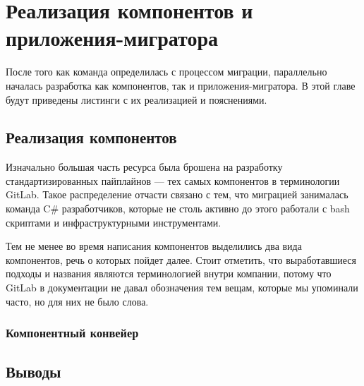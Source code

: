 \chapter{Реализация компонентов и приложения-мигратора} \label{ch:ch3}
После того как команда определилась с процессом миграции, параллельно началась разработка как компонентов, так и приложения-мигратора.
В этой главе будут приведены листинги с их реализацией и пояснениями.

\section{Реализация компонентов} \label{sec:components-impl}
Изначально большая часть ресурса была брошена на разработку стандартизированных пайплайнов — тех самых компонентов в терминологии GitLab.
Такое распределение отчасти связано с тем, что миграцией занималась команда C\# разработчиков, которые не столь активно до этого работали
с bash скриптами\cite{bash} и инфраструктурными инструментами.

Тем не менее во время написания компонентов выделились два вида компонентов, речь о которых пойдет далее.
Стоит отметить, что выработавшиеся подходы и названия являются терминологией внутри компании,
потому что GitLab в документации не давал обозначения тем вещам, которые мы упоминали часто, но для них не было слова.

\subsection{Компонентный конвейер} \label{subsec:component-template}


\section{Выводы} \label{sec:conclusion}
